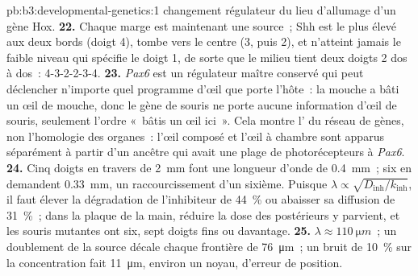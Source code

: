 \begin{solution}{pb:b3:developmental-genetics:1}
changement régulateur du lieu d'allumage d'un gène Hox.
\textbf{22.} Chaque marge est maintenant une source~; Shh est le plus
élevé aux deux bords (doigt 4), tombe vers le centre (3, puis 2), et
n'atteint jamais le faible niveau qui spécifie le doigt 1, de sorte que
le milieu tient deux doigts 2 dos à dos~: 4-3-2-2-3-4.
\textbf{23.} \emph{Pax6} est un régulateur maître conservé qui peut
déclencher n'importe quel programme d'œil que porte l'hôte~: la mouche a
bâti un œil de mouche, donc le gène de souris ne porte aucune
information d'œil de souris, seulement l'ordre «~bâtis un œil ici~».
Cela montre l' du réseau de gènes, non l'homologie des
organes~: l'œil composé et l'œil à chambre sont apparus séparément à
partir d'un ancêtre qui avait une plage de photorécepteurs à
\emph{Pax6}.
\textbf{24.} Cinq doigts en travers de \qty{2}{mm} font une longueur
d'onde de \qty{0.4}{mm}~; six en demandent \qty{0.33}{mm}, un
raccourcissement d'un sixième. Puisque
$\lambda \propto \sqrt{D_{\text{inh}}/k_{\text{inh}}}$, il faut élever la
dégradation de l'inhibiteur de \qty{44}{\%} ou abaisser sa diffusion de
\qty{31}{\%}~; dans la plaque de la main, réduire la dose des 
postérieurs y parvient, et les souris mutantes ont six, sept doigts fins
ou davantage.
\textbf{25.} $\lambda \approx \qty{110}{\micro m}$~; un doublement de la
source décale chaque frontière de \qty{76}{\micro m}~; un bruit de
\qty{10}{\%} sur la concentration fait \qty{11}{\micro m}, environ un
noyau, d'erreur de position.
\end{solution}
